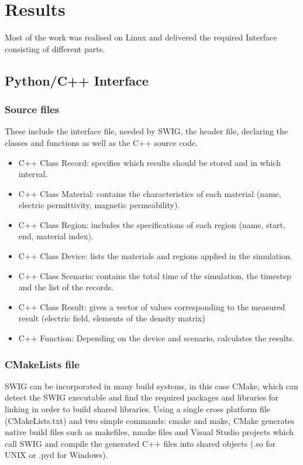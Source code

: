 \chapter{Results}
\label{chapter:results}
Most of the work was realised on Linux and delivered the required Interface consisting of different parts.
\section{Python/C++ Interface}
\subsection{Source files} 
These include the interface file, needed by SWIG, the header file, declaring the classes and functions as well as the C++ source code.
\begin{itemize}
\item C++ Class Record: specifies which results should be stored and in which interval.
\item C++ Class Material: contains the characteristics of each material (name, electric permittivity, magnetic permeability).
\item C++ Class Region: includes the specifications of each region (name, start, end, material index).
\item C++ Class Device: lists the materials and regions applied in the simulation.
\item C++ Class Scenario: contains the total time of the simulation, the timestep and the list of the records.
\item C++ Class Result: gives a vector of values corresponding to the measured result (electric field, elements of the density matrix)
\item C++ Function: Depending on the device and scenario, calculates the results.
\end{itemize}

\subsection{CMakeLists file}
SWIG can be incorporated in many build systems, in this case CMake, which can detect the SWIG executable and find the required packages and libraries for linking in order to build shared libraries. Using a single cross platform file (CMakeLists.txt) and two simple commands: cmake and make, CMake generates native build files such as makefiles, nmake files and Visual Studio projects which call SWIG and compile the generated C++ files into shared objects (.so for UNIX or .pyd for Windows).

